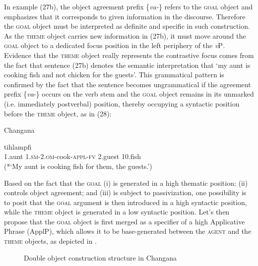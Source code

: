 \documentclass[output=paper]{langsci/langscibook}
\begin{document}
{In example (27b), the object agreement prefix \{}{\textit{va-}}{\} refers to the }{\textsc{goal}} {object and emphasizes that it corresponds to given information in the discourse. Therefore the }{\textsc{goal}} {object must be interpreted as definite and specific in such construction. As the }{\textsc{theme}} {object carries new information in (27b), it must move around the }{\textsc{goal}} {object to a dedicated focus position in the left periphery of the }{\textit{v}}{P}{\textit{. }}{Evidence that the }{\textsc{theme}} {object really represents the contrastive focus comes from the fact that sentence (27b) denotes the semantic interpretation that ‘my aunt is cooking fish and not chicken for the guests’. This grammatical pattern is confirmed by the fact that the sentence becomes ungrammatical if the agreement prefix \{}{\textit{va}}{{}-\} occurs on the verb stem and the }{\textsc{goal}} {object remains in its unmarked (i.e. immediately postverbal) position, thereby occupying a syntactic position before the }{\textsc{theme}} {object, as }in (28):

{Changana}

\ea
{}         {tihlampfi}\\
     1.aunt          1.{\textsc{sm}}{{}-2.}{\textsc{om}}{{}-}cook{{}-}{\textsc{appl}}{{}-}{\textsc{fv}}       {}2.guest             {10.}fish\\
\glt (*‘My aunt is cooking fish for them, the guests.’)
\z



Based on the fact that the \textsc{goal} (i) is generated in a high thematic position; (ii) controls object agreement; and (iii) is subject to passivization, one possibility is to posit that the \textsc{goal} argument is then introduced in a high syntactic position, while the \textsc{theme} object is generated in a low syntactic position. Let’s then propose that the \textsc{goal} object is first merged as a specifier of a high Applicative Phrase (ApplP), which allows it to be base-generated between the \textsc{agent} and the \textsc{theme} objects, as depicted in .

  
 

\begin{figure}
\caption{Double object construction structure in Changana}
\label{fig:3}
\end{figure}
\end{document}
